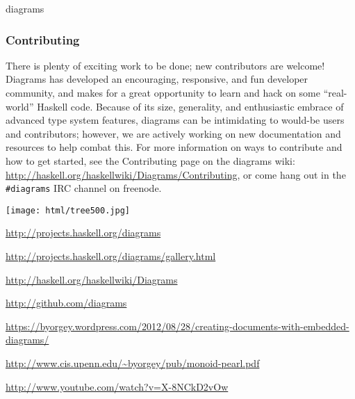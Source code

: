 \begin{hcarentry}[updated]{diagrams}
\subsubsection*{Contributing}

There is plenty of exciting work to be done; new contributors are
welcome!  Diagrams has developed an encouraging, responsive, and fun
developer community, and makes for a great opportunity to learn and
hack on some ``real-world'' Haskell code.  Because of its size,
generality, and enthusiastic embrace of advanced type system features,
diagrams can be intimidating to would-be users and contributors;
however, we are actively working on new documentation and resources to
help combat this.  For more information on ways to contribute and how
to get started, see the Contributing page on the diagrams wiki:
\url{http://haskell.org/haskellwiki/Diagrams/Contributing}, or come
hang out in the \texttt{\#diagrams} IRC channel on freenode.

\begin{center}
\texttt{[image: html/tree500.jpg]}
\end{center}

\FurtherReading
\begin{compactitem}
\item \url{http://projects.haskell.org/diagrams}
\item \url{http://projects.haskell.org/diagrams/gallery.html}
\item \url{http://haskell.org/haskellwiki/Diagrams}
\item \url{http://github.com/diagrams}
\item
  \url{https://byorgey.wordpress.com/2012/08/28/creating-documents-with-embedded-diagrams/}
\item \url{http://www.cis.upenn.edu/~byorgey/pub/monoid-pearl.pdf}
\item \url{http://www.youtube.com/watch?v=X-8NCkD2vOw}
\end{compactitem}
\end{hcarentry}
